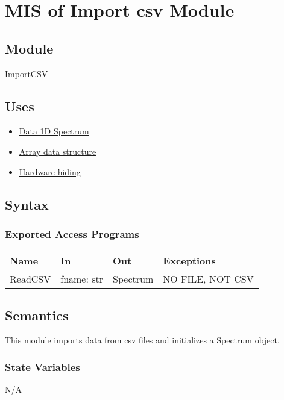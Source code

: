 \documentclass[12pt, titlepage]{article}
\begin{document}
\section{MIS of Import csv Module} \label{Mod:ImportCSV} 
\subsection{Module}
ImportCSV

\subsection{Uses}
\begin{itemize}
    \item \hyperref[Mod:Spectrum]{Data 1D Spectrum}
    \item \hyperref[Mod:Array]{Array data structure}
    \item \hyperref[Mod:HH]{Hardware-hiding}
\end{itemize}

\subsection{Syntax}

\subsubsection{Exported Access Programs}

\begin{center}
    \begin{tabular}{p{2cm} p{4cm} p{4cm} p{5cm}}
        \hline
        \textbf{Name} & \textbf{In} & \textbf{Out} & \textbf{Exceptions} \\
        \hline
        ReadCSV & fname: str & Spectrum & NO FILE, NOT CSV\\
        \hline
    \end{tabular}
\end{center}

\subsection{Semantics}
This module imports data from csv files and initializes a Spectrum object.

\subsubsection{State Variables}
N/A
\end{document}
